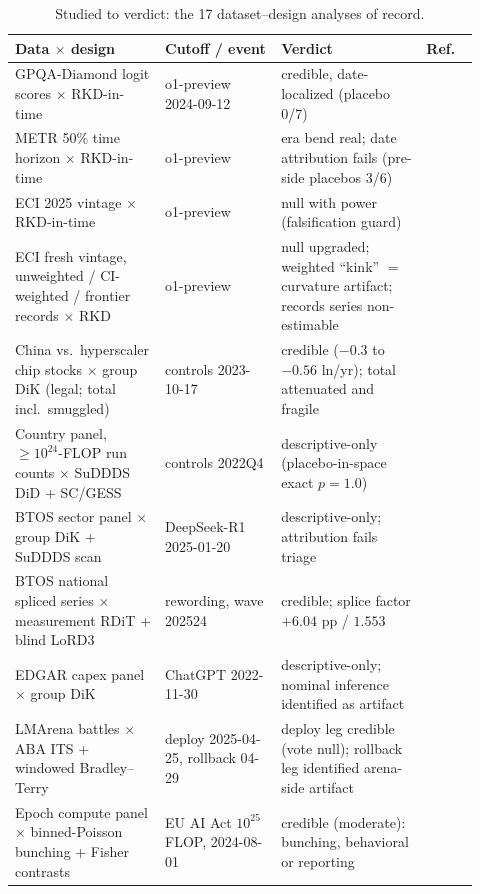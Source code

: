 \documentclass[11pt]{article}
\begin{document}
\begin{table}[p]
\centering
\footnotesize
\setlength{\tabcolsep}{4pt}
\caption{Studied to verdict: the 17 dataset--design analyses of record.}
\label{tab:studied}
\begin{tabular}{@{}p{0.31\linewidth}p{0.24\linewidth}p{0.30\linewidth}p{0.075\linewidth}@{}}
\toprule
Data $\times$ design & Cutoff / event & Verdict & Ref.\ \\
\midrule
GPQA-Diamond logit scores $\times$ RKD-in-time & o1-preview 2024-09-12 &
credible, date-localized (placebo 0/7) & \cite{flagship} \\
METR 50\% time horizon $\times$ RKD-in-time & o1-preview &
era bend real; date attribution fails (pre-side placebos 3/6) & \cite{flagship} \\
ECI 2025 vintage $\times$ RKD-in-time & o1-preview &
null with power (falsification guard) & \cite{flagship} \\
ECI fresh vintage, unweighted / CI-weighted / frontier records $\times$ RKD &
o1-preview & null upgraded; weighted ``kink'' $=$ curvature artifact;
records series non-estimable & \cite{noteeci} \\
China vs.\ hyperscaler chip stocks $\times$ group DiK (legal; total incl.\
smuggled) & controls 2023-10-17 & credible ($-0.3$ to $-0.56$ ln/yr);
total attenuated and fragile & \cite{noteexport} \\
Country panel, $\geq 10^{24}$-FLOP run counts $\times$ SuDDDS DiD + SC/GESS &
controls 2022Q4 & descriptive-only (placebo-in-space exact $p=1.0$) &
\cite{noteexport} \\
BTOS sector panel $\times$ group DiK + SuDDDS scan & DeepSeek-R1 2025-01-20 &
descriptive-only; attribution fails triage & \cite{notebtosr1} \\
BTOS national spliced series $\times$ measurement RDiT + blind LoRD3 &
rewording, wave 202524 & credible; splice factor $+6.04$ pp / $1.553$ &
\cite{notereword} \\
EDGAR capex panel $\times$ group DiK & ChatGPT 2022-11-30 &
descriptive-only; nominal inference identified as artifact & \cite{notecapex} \\
LMArena battles $\times$ ABA ITS + windowed Bradley--Terry & deploy
2025-04-25, rollback 04-29 & deploy leg credible (vote null); rollback leg
identified arena-side artifact & \cite{notelmarena} \\
Epoch compute panel $\times$ binned-Poisson bunching + Fisher contrasts &
EU AI Act $10^{25}$ FLOP, 2024-08-01 & credible (moderate): bunching,
behavioral or reporting & \cite{noteeuact} \\

\end{tabular}
\end{table}
\end{document}

